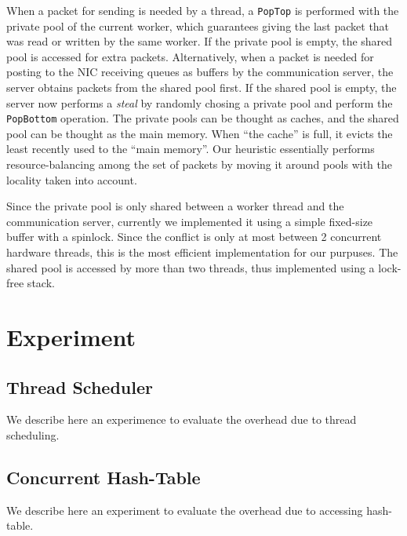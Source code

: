 \documentclass{sig-alternate-05-2015}
\begin{document}
When a packet for sending is needed by a thread, a \texttt{PopTop} is performed
with the private pool of the current worker, which guarantees giving the last
packet that was read or written by the same worker. If the private pool is
empty, the shared pool is accessed for extra packets.  Alternatively, when a
packet is needed for posting to the NIC receiving queues as buffers by the
communication server, the server obtains packets from the shared pool first.
If the shared pool is empty, the server now performs a \textit{steal} by
randomly chosing a private pool and perform the \texttt{PopBottom} operation.
The private pools can be thought as caches, and the shared pool can be thought
as the main memory. When ``the cache'' is full, it evicts the least recently
used to the ``main memory''. Our heuristic essentially performs
resource-balancing among the set of packets by moving it around pools with the
locality taken into account.

Since the private pool is only shared between a worker thread and the
communication server, currently we implemented it using a simple fixed-size
buffer with a spinlock. Since the conflict is only at most between 2 concurrent
hardware threads, this is the most efficient implementation for our purpuses.
The shared pool is accessed by more than two threads, thus implemented using a
lock-free stack.

\section{Experiment}
\label{sec:exp}
\subsection{Thread Scheduler}
We describe here an experimence to evaluate the overhead due to thread scheduling.


\subsection{Concurrent Hash-Table}
We describe here an experiment to evaluate the overhead due to accessing hash-table.
\end{document}
